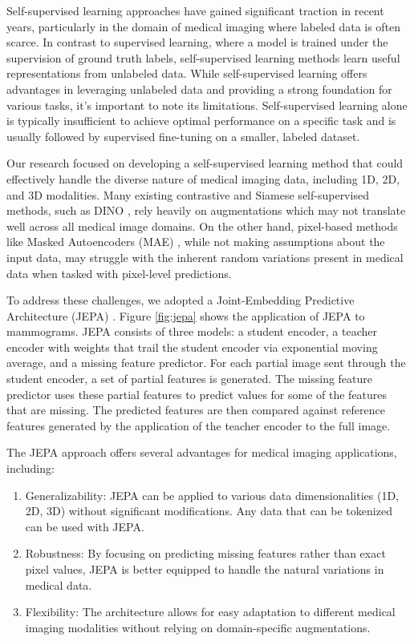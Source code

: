 \documentclass[12pt]{article}
\begin{document}
Self-supervised learning approaches have gained significant traction in recent years, particularly in the domain of medical imaging where labeled data is often scarce. 
In contrast to supervised learning, where a model is trained under the supervision of ground truth labels,
self-supervised learning methods learn useful representations from unlabeled data. 
While self-supervised learning offers advantages in leveraging unlabeled data and providing a strong foundation for various tasks, it's important to note its limitations. Self-supervised learning alone is typically insufficient to achieve optimal performance on a specific task and is usually followed by supervised fine-tuning on a smaller, labeled dataset.

Our research focused on developing a self-supervised learning method that could effectively handle the diverse nature of medical imaging data, including 1D, 2D, and 3D modalities.
Many existing contrastive and Siamese self-supervised methods, such as DINO \cite{caron2021emerging}, rely heavily on augmentations which may not translate well across all medical image domains. On the other hand, pixel-based methods like Masked Autoencoders (MAE) \cite{he2022masked}, while not making assumptions about the input data, may struggle with the inherent random variations present in medical data when tasked with pixel-level predictions.

To address these challenges, we adopted a Joint-Embedding Predictive Architecture (JEPA) \cite{assran2023self}. 
Figure \ref{fig:jepa} shows the application of JEPA to mammograms.
JEPA consists of three models: a student encoder, a teacher encoder with weights that trail the student encoder via exponential moving average, and a missing feature predictor.
For each partial image sent through the student encoder, a set of partial features is generated.
The missing feature predictor uses these partial features to predict values for some of the
features that are missing.
The predicted features are then compared against reference features generated by the application of the teacher encoder to the full image.

The JEPA approach offers several advantages for medical imaging applications, including:
\begin{enumerate}
    \item Generalizability: JEPA can be applied to various data dimensionalities (1D, 2D, 3D) without significant modifications.
      Any data that can be tokenized can be used with JEPA.
    \item Robustness: By focusing on predicting missing features rather than exact pixel values, JEPA is better equipped to handle the natural variations in medical data.
    \item Flexibility: The architecture allows for easy adaptation to different medical imaging modalities without relying on domain-specific augmentations.
\end{enumerate}
\end{document}
